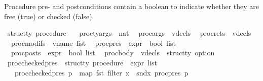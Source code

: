 \begin{isabellebody}
\begin{isamarkuptext}
\end{isamarkuptext}\isamarkuptrue%
%
\begin{isamarkuptext}%
Procedure pre- and postconditions contain a boolean to indicate whether they are free (true) or 
      checked (false).%
\end{isamarkuptext}\isamarkuptrue%
\isamarkupfalse%
\ {\isacharprime}{\kern0pt}struct{\isacharunderscore}{\kern0pt}ty\ procedure\ {\isacharequal}{\kern0pt}\isanewline
\ \ proc{\isacharunderscore}{\kern0pt}ty{\isacharunderscore}{\kern0pt}args\ {\isacharcolon}{\kern0pt}{\isacharcolon}{\kern0pt}\ nat\isanewline
\ \ proc{\isacharunderscore}{\kern0pt}args\ {\isacharcolon}{\kern0pt}{\isacharcolon}{\kern0pt}\ vdecls\isanewline
\ \ proc{\isacharunderscore}{\kern0pt}rets\ {\isacharcolon}{\kern0pt}{\isacharcolon}{\kern0pt}\ vdecls\isanewline
\ \ proc{\isacharunderscore}{\kern0pt}modifs\ {\isacharcolon}{\kern0pt}{\isacharcolon}{\kern0pt}\ {\isachardoublequoteopen}vname\ list{\isachardoublequoteclose}\isanewline
\ \ proc{\isacharunderscore}{\kern0pt}pres\ {\isacharcolon}{\kern0pt}{\isacharcolon}{\kern0pt}\ {\isachardoublequoteopen}{\isacharparenleft}{\kern0pt}expr\ {\isasymtimes}\ bool{\isacharparenright}{\kern0pt}\ list{\isachardoublequoteclose}\ \isanewline
\ \ proc{\isacharunderscore}{\kern0pt}posts\ {\isacharcolon}{\kern0pt}{\isacharcolon}{\kern0pt}\ {\isachardoublequoteopen}{\isacharparenleft}{\kern0pt}expr\ {\isasymtimes}\ bool{\isacharparenright}{\kern0pt}\ list{\isachardoublequoteclose}\isanewline
\ \ proc{\isacharunderscore}{\kern0pt}body\ {\isacharcolon}{\kern0pt}{\isacharcolon}{\kern0pt}\ {\isachardoublequoteopen}{\isacharparenleft}{\kern0pt}vdecls\ {\isasymtimes}\ {\isacharprime}{\kern0pt}struct{\isacharunderscore}{\kern0pt}ty{\isacharparenright}{\kern0pt}\ option{\isachardoublequoteclose}\isanewline
\isanewline
{}\isamarkupfalse%
\ proc{\isacharunderscore}{\kern0pt}checked{\isacharunderscore}{\kern0pt}pres\ {\isacharcolon}{\kern0pt}{\isacharcolon}{\kern0pt}\ {\isachardoublequoteopen}{\isacharprime}{\kern0pt}struct{\isacharunderscore}{\kern0pt}ty\ procedure\ {\isasymRightarrow}\ expr\ list{\isachardoublequoteclose}\isanewline
\ \ \ {\isachardoublequoteopen}proc{\isacharunderscore}{\kern0pt}checked{\isacharunderscore}{\kern0pt}pres\ p\ {\isacharequal}{\kern0pt}\ map\ fst\ {\isacharparenleft}{\kern0pt}filter\ {\isacharparenleft}{\kern0pt}{\isasymlambda}x{\isachardot}{\kern0pt}\ {\isasymnot}\ snd{\isacharparenleft}{\kern0pt}x{\isacharparenright}{\kern0pt}{\isacharparenright}{\kern0pt}\ {\isacharparenleft}{\kern0pt}proc{\isacharunderscore}{\kern0pt}pres\ p{\isacharparenright}{\kern0pt}{\isacharparenright}{\kern0pt}{\isachardoublequoteclose}\isanewline

\end{isabellebody}

